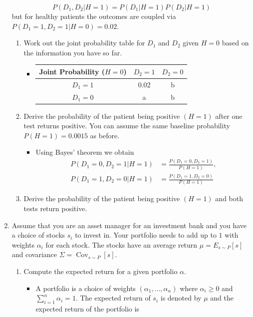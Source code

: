 \documentclass{article}
\begin{document}
\begin{enumerate}
	$$
	P(D_1, D_2|H = 1) = P(D_1 | H = 1)P(D_2 | H = 1)
	$$
	but for healthy patients the outcomes are coupled via $P(D_1 = 1, D_2 = 1| H = 0) = 0.02$.
	\begin{enumerate}
		\item Work out the joint probability table for $D_1$ and $D_2$ given $H = 0$ based on the information you have so far.
			\begin{itemize}
				\item
					\begin{center}
						\begin{tabular}{|c|c|c|} \hline
						Joint Probability ($H = 0$) & $D_2 = 1$ & $D_2 = 0$ \\ \hline
						$D_1 = 1$ & 0.02 & b \\ \hline
						$D_1 = 0$ & a & b \\ \hline
						\end{tabular}
					\end{center}
			\end{itemize}
		\item Derive the probability of the patient being positive $(H = 1)$ after one test returns positive. You can assume the same baseline probability $P(H = 1) = 0.0015$ as before.
			\begin{itemize}
				\item Using Bayes' theorem we obtain
				$$
				\begin{aligned}
				P(D_1 = 0, D_2 = 1 | H = 1) &= \frac{P(D_1 = 0, D_2 = 1)}{P(H = 1)}, \\
				P(D_1 = 1, D_2 = 0 | H = 1) &= \frac{P(D_1 = 1, D_2 = 0)}{P(H = 1)}
				\end{aligned}
				$$
			\end{itemize}
		\item Derive the probability of the patient being positive $(H = 1)$ and both tests return positive.
	\end{enumerate}
	\item Assume that you are an asset manager for an investment bank and you have a choice of stocks $s_i$ to invest in. Your portfolio needs to add up to $1$ with weights $\alpha_i$ for each stock. The stocks have an average return $\mu = E_{s \sim P}[s]$ and covariance $\Sigma = \operatorname{Cov}_{s \sim P}[s]$.
		\begin{enumerate}
			\item Compute the expected return for a given portfolio $\alpha$.
				\begin{itemize}
					\item A portfolio is a choice of weights $(\alpha_1, \dots, \alpha_n)$ where $\alpha_i \geq 0$ and $\sum_{i = 1}^n \alpha_i = 1$. The expected return of $s_i$ is denoted by $\mu$ and the expected return of the portfolio is

\end{itemize}
\end{enumerate}
\end{enumerate}
\end{document}
